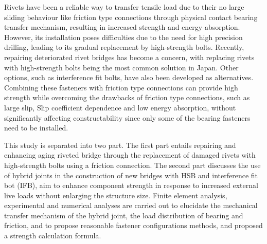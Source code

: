 \onehalfspacing 

Rivets have been a reliable way to transfer tensile load due to their no large sliding behaviour like friction type connections through physical contact bearing transfer mechanism, resulting in increased strength and energy absorption. However, its installation poses difficulties due to the need for high precision drilling, leading to its gradual replacement by high-strength bolts. Recently, repairing deteriorated rivet bridges has become a concern, with replacing rivets with high-strength bolts being the most common solution in Japan. Other options, such as interference fit bolts, have also been developed as alternatives. Combining these fasteners with friction type connections can provide high strength while overcoming the drawbacks of friction type connections, such as large slip, Slip coefficient dependence and low energy absorption, without significantly affecting constructability since only some of the bearing fasteners need to be installed.

This study is separated into two part. The first part entails repairing and enhancing aging riveted bridge through the replacement of damaged rivets with high-strength bolts using a friction connection. The second part discusses the use of hybrid joints in the construction of new bridges with HSB and interference fit bot (IFB), aim to enhance component strength in response to increased external live loads without enlarging the structure size. Finite element analysis, experimental and numerical analyses are carried out to elucidate the mechanical transfer mechanism of the hybrid joint, the load distribution of bearing and friction, and to propose reasonable fastener configurations methods, and proposed a strength calculation formula.

